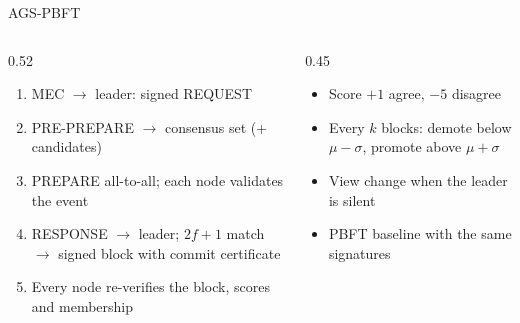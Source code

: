 \documentclass[aspectratio=169,10pt]{beamer}
\begin{document}
\begin{frame}{AGS-PBFT}
\small
\begin{columns}[T]
\begin{column}{0.52\textwidth}
\begin{enumerate}
\item MEC $\rightarrow$ leader: signed REQUEST
\item PRE-PREPARE $\rightarrow$ consensus set (+ candidates)
\item PREPARE all-to-all; each node validates the event
\item RESPONSE $\rightarrow$ leader; $2f+1$ match $\rightarrow$ signed block with commit certificate
\item Every node re-verifies the block, scores and membership
\end{enumerate}
\end{column}
\begin{column}{0.45\textwidth}
\begin{itemize}
\item Score $+1$ agree, $-5$ disagree
\item Every $k$ blocks: demote below $\mu-\sigma$, promote above $\mu+\sigma$
\item View change when the leader is silent
\item PBFT baseline with the same signatures
\end{itemize}
\end{column}
\end{columns}
\end{frame}
\end{document}
